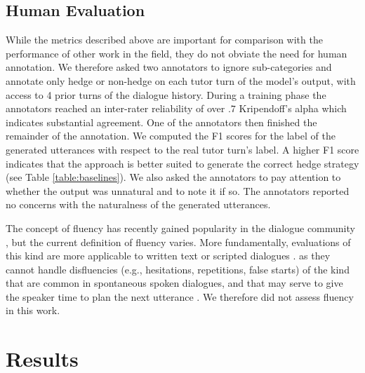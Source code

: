 \documentclass[11pt]{article}
\begin{document}
\subsection{Human Evaluation}\label{human_evaluation}

While the metrics described above are important for comparison with the performance of other work in the field, they do not obviate the need for human annotation. We therefore asked two annotators to ignore sub-categories and annotate only hedge or non-hedge on each tutor turn of the model's output, with access to 4 prior turns of the dialogue history.  During a training phase  the annotators reached an inter-rater reliability of over $.7$ Kripendoff’s alpha \citep{krippendorff2004reliability} which indicates substantial agreement. One of the annotators then finished the remainder of the annotation. We computed the F1 scores for the label of the generated utterances with respect to the real tutor turn's  label. A higher F1 score indicates that the approach is better suited to generate the correct hedge strategy (see Table \ref{table:baselines}). We also asked the annotators to pay attention to whether the output was unnatural and to note it if so. The annotators reported no concerns with the naturalness of the generated utterances.

The concept of fluency has recently gained popularity in the dialogue community \citep{li2019incremental, see2019makes}, but the current definition of fluency varies. More fundamentally, evaluations of this kind are more applicable to written text or scripted dialogues \citep{pang2020towards, d2019automatic}. as they cannot handle disfluencies (e.g., hesitations, repetitions, false starts) of the kind that are common in spontaneous spoken dialogues, and that may serve to give the speaker time to plan the next utterance \citep{biber1999longman, thornbury2006conversation}. We therefore did not assess fluency in this work.

\section{Results}
\end{document}
